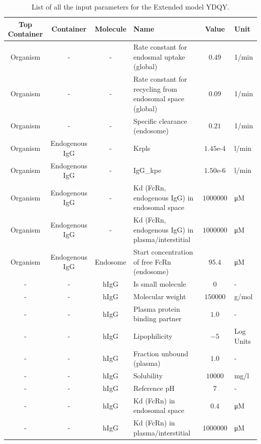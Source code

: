 \documentclass[fleqn,10pt]{physiome}
\begin{document}
\begin{landscape}
\begin{table}[htbp]
\centering
    \begin{threeparttable}
        \caption{List of all the input parameters for the Extended model YDQY.}\label{tbl:4}
        \begin{tabular}{ccclcl}
            \toprule
            Top Container & Container & Molecule & Name & Value & Unit \\
            \midrule
            Organism & - & - & Rate constant for endosmal uptake (global) & $0.49$ & 1/min \\
            Organism & - & - & Rate constant for recycling from endosomal space (global) & $0.09$ & 1/min \\
            Organism & - & - & Specific clearance (endosome) & $0.21$ & 1/min \\
            Organism & Endogenous IgG & - & Krpls & $1.45$e-4 & l/min \\
            Organism & Endogenous IgG & - & IgG\_kpe & $1.50$e-6 & l/min \\
            Organism & Endogenous IgG & - & Kd (FcRn, endogenous IgG) in endosomal space & $1000000$ & \si{\micro M} \\
            Organism & Endogenous IgG & - & Kd (FcRn, endogenous IgG) in plasma/interstitial & $1000000$ & \si{\micro M} \\
            Organism & Endogenous IgG & Endosome & Start concentration of free FcRn (endosome) & $95.4$ & \si{\micro M} \\
            - & - & hIgG & Is small molecule & $0$ & -\\
            - & - & hIgG & Molecular weight & $150000$ & g/mol\\
            - & - & hIgG & Plasma protein binding partner & $1.0$ & -\\
            - & - & hIgG & Lipophilicity & $-5$ & Log Units \\
            - & - & hIgG & Fraction unbound (plasma) & $1.0$ & -\\
            - & - & hIgG & Solubility & $10000$ & mg/l\\
            - & - & hIgG & Reference pH & $7$ & -\\
            - & - & hIgG & Kd (FcRn) in endosomal space & $0.4$ & \si{\micro M}\\
            - & - & hIgG & Kd (FcRn) in plasma/interstitial & $1000000$ & \si{\micro M}\\

\end{tabular}
\end{threeparttable}
\end{table}
\end{landscape}
\end{document}

